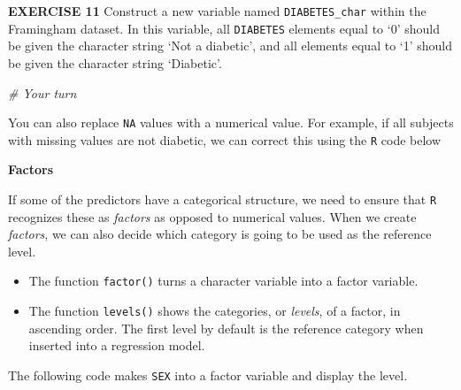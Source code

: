 \documentclass[
]{article}
\newenvironment{Shaded}{\begin{snugshade}}{\end{snugshade}}
\newcommand{\CommentTok}[1]{\textcolor[rgb]{0.56,0.35,0.01}{\textit{#1}}}
\newcommand{\DecValTok}[1]{\textcolor[rgb]{0.00,0.00,0.81}{#1}}
\newcommand{\KeywordTok}[1]{\textcolor[rgb]{0.13,0.29,0.53}{\textbf{#1}}}
\newcommand{\NormalTok}[1]{#1}
\newcommand{\OperatorTok}[1]{\textcolor[rgb]{0.81,0.36,0.00}{\textbf{#1}}}
\newcommand{\StringTok}[1]{\textcolor[rgb]{0.31,0.60,0.02}{#1}}
\begin{document}
\textbf{EXERCISE 11} Construct a new variable named
\texttt{DIABETES\_char} within the Framingham dataset. In this variable,
all \texttt{DIABETES} elements equal to `0' should be given the
character string `Not a diabetic', and all elements equal to `1' should
be given the character string `Diabetic'.

\begin{Shaded}
\begin{Highlighting}[]
\CommentTok{# Your turn}
\end{Highlighting}
\end{Shaded}

You can also replace \texttt{NA} values with a numerical value. For
example, if all subjects with missing values are not diabetic, we can
correct this using the \texttt{R} code below

\begin{Shaded}
\end{Shaded}

\textbf{Factors}

If some of the predictors have a categorical structure, we need to
ensure that \texttt{R} recognizes these as \emph{factors} as opposed to
numerical values. When we create \emph{factors}, we can also decide
which category is going to be used as the reference level.

\begin{itemize}
\item
  The function \texttt{factor()} turns a character variable into a
  factor variable.
\item
  The function \texttt{levels()} shows the categories, or \emph{levels},
  of a factor, in ascending order. The first level by default is the
  reference category when inserted into a regression model.
\end{itemize}

The following code makes \texttt{SEX} into a factor variable and display
the level.

\begin{Shaded}
\end{Shaded}
\end{document}
